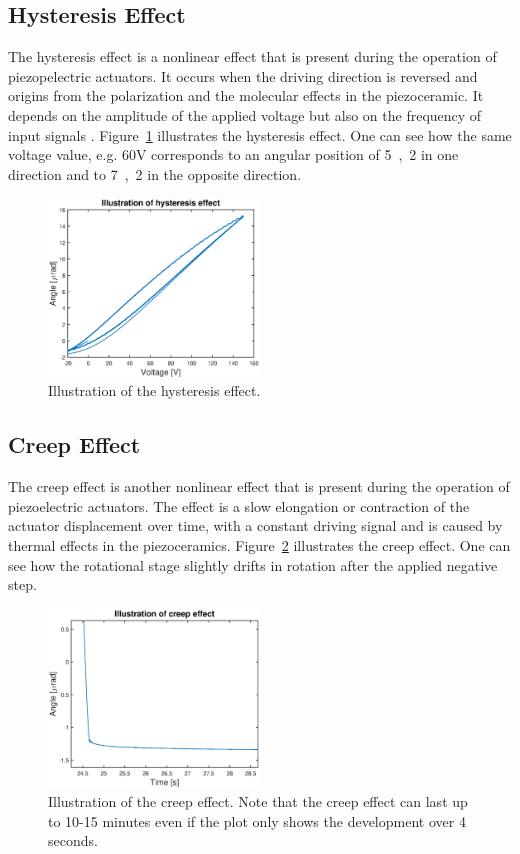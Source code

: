 \subsection{Hysteresis Effect}
The hysteresis effect is a nonlinear effect that is present during the operation of piezopelectric actuators. It occurs when the driving direction is reversed and origins from the polarization and the molecular effects in the piezoceramic. It depends on the amplitude of the applied voltage but also on the frequency of input signals \cite{Qingson:2016}. Figure~\ref{fig:hysteresis} illustrates the hysteresis effect. One can see how the same voltage value, e.g. 60V corresponds to an angular position of \unit{5,2}{\micro\rad} in one direction and to \unit{7,2}{\micro\rad} in the opposite direction.

\begin{figure}[h]
  \centering
  \includegraphics[width=0.5\textwidth]{fig/matlab/hysteresis.eps}
  \caption{\label{fig:hysteresis}Illustration of the hysteresis effect.}
\end{figure}

\subsection{Creep Effect}
The creep effect is another nonlinear effect that is present during the operation of piezoelectric actuators. The effect is a slow elongation or contraction of the actuator displacement over time, with a constant driving signal and is caused by thermal effects in the piezoceramics. Figure~\ref{fig:creep} illustrates the creep effect. One can see how the rotational stage slightly drifts in rotation after the applied negative step.

\begin{figure}[h]
  \centering
  \includegraphics[width=0.5\textwidth]{fig/matlab/creep.eps}
  \caption{\label{fig:creep}Illustration of the creep effect. Note that the creep effect can last up to 10-15 minutes even if the plot only shows the development over 4 seconds.}
\end{figure}

